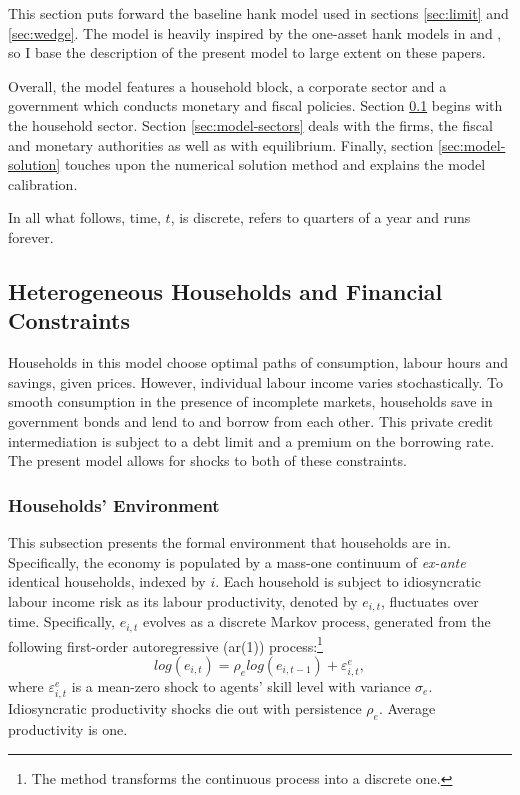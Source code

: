 \documentclass[a4paper,12pt]{article} %
\numberwithin{equation}{section} %
\numberwithin{figure}{section}
\numberwithin{table}{section}
\begin{document}
This section puts forward the baseline \Gls{hank} model used in sections \ref{sec:limit} and \ref{sec:wedge}. The model is heavily inspired by the one-asset \Gls{hank} models in \textcite{auclert2021} and \textcite{boehl2023econpizza}, so I base the description of the present model to large extent on these papers.

Overall, the model features a household block, a corporate sector and a government which conducts monetary and fiscal policies. Section \ref{sec:model-hh} begins with the household sector. Section \ref{sec:model-sectors} deals with the firms, the fiscal and monetary authorities as well as with equilibrium. Finally, section \ref{sec:model-solution} touches upon the numerical solution method and explains the model calibration. 

In all what follows, time, $t$, is discrete, refers to quarters of a year and runs forever.

\subsection{Heterogeneous Households and Financial Constraints}
\label{sec:model-hh}

Households in this model choose optimal paths of consumption, labour hours and savings, given prices. However, individual labour income varies stochastically. To smooth consumption in the presence of incomplete markets, households save in government bonds and lend to and borrow from each other. This private credit intermediation is subject to a debt limit and a premium on the borrowing rate. The present model allows for shocks to both of these constraints.

\subsubsection{Households' Environment}
\label{sec:model-hh-environment}

This subsection presents the formal environment that households are in. Specifically, the economy is populated by a mass-one continuum of \textit{ex-ante} identical households, indexed by $i$. Each household is subject to idiosyncratic labour income risk as its labour productivity, denoted by $e_{i,t}$, fluctuates over time. Specifically, $e_{i,t}$ evolves as a discrete Markov process, generated from the following first-order autoregressive (\Gls{ar}(1)) process:\footnote{The \textcite{rouwenhorst1995} method transforms the continuous process into a discrete one.}
\begin{equation}
    log(e_{i,t}) = \rho_e log(e_{i,t-1}) + \varepsilon^e_{i,t}, \label{eq:hh-income-process}
\end{equation}
where $\varepsilon^e_{i,t}$ is a mean-zero shock to agents' skill level with variance $\sigma_e$. Idiosyncratic productivity shocks die out with persistence $\rho_e$. Average productivity is one. %
\end{document}
